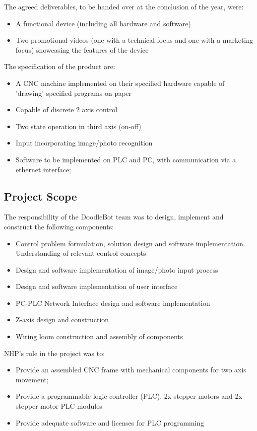The agreed deliverables, to be handed over at the conclusion of the year, were:
	\begin{itemize}
		\item A functional device (including all hardware and software)
		\item Two promotional videos (one with a technical focus and one with a marketing focus) showcasing the features of the device
	\end{itemize}	

The specification of the product are:
	\begin{itemize}
		\item A CNC machine implemented on their specified hardware capable of 'drawing' specified programs on paper
		\item Capable of discrete 2 axis control
		\item Two state operation in third axis (on-off)
		\item Input incorporating image/photo recognition
		\item Software to be implemented on PLC and PC, with communication via a ethernet interface;
	\end{itemize}

\subsection{Project Scope}
The responsibility of the DoodleBot team was to design, implement and construct the following components:
	\begin{itemize}
		\item Control problem formulation, solution design and software implementation. Understanding of relevant control concepts
		\item Design and software implementation of image/photo input process
		\item Design and software implementation of user interface
		\item PC-PLC Network Interface design and software implementation
		\item Z-axis design and construction
		\item Wiring loom construction and assembly of components
	\end{itemize}
	
NHP's role in the project was to:
	\begin{itemize}
		\item Provide an assembled CNC frame with mechanical components for two axis movement;
		\item Provide a programmable logic controller (PLC), 2x stepper motors and 2x stepper motor PLC modules
		\item Provide adequate software and licenses for PLC programming
	\end{itemize}


